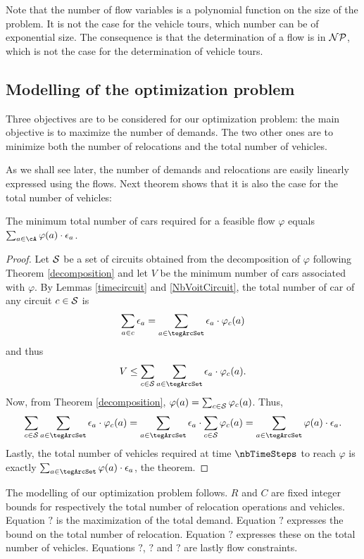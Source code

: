 \begin{bibunit}[ieeetr]
Note that the  number of flow variables is a polynomial function on the size of the problem.
It is not the case for the vehicle tours, which number can be of exponential size.
The consequence is that the determination of a flow is in ${\cal NP}$, which is not the case for the determination of vehicle tours.

\subsection{Modelling of the optimization problem}
Three objectives are to be considered for our optimization problem: the main objective is to maximize the number of demands. The two other ones are to minimize both the number of relocations and the total number of vehicles.

As we shall see later, the number of demands and relocations are easily linearly expressed using the flows. Next theorem shows that it is also the case for the total number of vehicles:

\begin{theorem} \label{NbVoiture}
The minimum total number of cars required for a feasible flow $\varphi$ equals
$\sum_{a\in \cA} \varphi(a) \cdot \epsilon_a$.
\end{theorem}
\begin{proof}
Let ${\cal S}$ be a set of circuits obtained from the decomposition of $\varphi$
following Theorem \ref{decomposition} and let $V$ be the minimum number
of cars associated with $\varphi$.
By Lemmas  \ref{timecircuit} and \ref{NbVoitCircuit}, the total number of car of any circuit $c\in {\cal S}$ is
\[\sum_{a\in c} \epsilon_a = \sum_{a\in \tegArcSet} \epsilon_a \cdot \varphi_c(a)\]
and thus
\[V \leq \sum_{c\in {\cal S}} \sum_{a\in \tegArcSet} \epsilon_a \cdot \varphi_c(a).\]
Now, from  Theorem \ref{decomposition}, $\varphi (a)= \sum_{c\in {\cal S}}\varphi_c(a)$.
Thus, 
\[\sum_{c\in {\cal S}} \sum_{a\in \tegArcSet} \epsilon_a \cdot \varphi_c(a)=\sum_{a\in \tegArcSet} \epsilon_a \cdot \sum_{c\in {\cal S}}  \varphi_c(a)=\sum_{a\in \tegArcSet} \varphi(a) \cdot \epsilon_a.\]
Lastly, the total number of vehicles required at time $\nbTimeSteps$ to reach $\varphi$ is exactly $\sum_{a\in \tegArcSet} \varphi(a) \cdot \epsilon_a$, the theorem.
\end{proof}

The modelling of our optimization problem follows. $R$ and $C$ are fixed integer bounds for respectively  the total number of relocation operations and vehicles.
Equation $?$ is the maximization of the total demand.
Equation $?$ expresses the bound on the total number of relocation.
Equation $?$ expresses these on the total number of vehicles.
Equations $?$, $?$ and $?$ are lastly flow constraints.


\end{bibunit}
